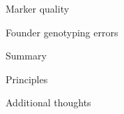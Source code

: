 \documentclass[aspectratio=169,12pt,t]{beamer}
\begin{document}











\begin{frame}[c]{}

\centerline{\Large \color{title} Marker quality}

\note{
}

\end{frame}










\begin{frame}[c]{}

\centerline{\Large \color{title} Founder genotyping errors}

\note{
}

\end{frame}





\begin{frame}[c]{Summary}

\note{
}

\end{frame}



\begin{frame}[c]{Principles}

\note{
}

\end{frame}



\begin{frame}[c]{Additional thoughts}

\note{
}

\end{frame}
\end{document}
